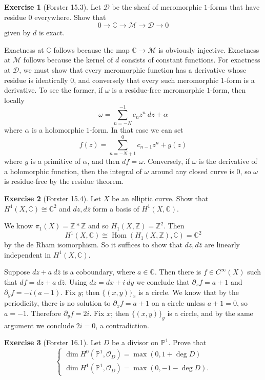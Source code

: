 \documentclass[10pt]{article}
\newcommand{\ZZ}{\mathbb{Z}}
\newcommand{\CC}{\mathbb{C}}
\newcommand{\PP}{\mathbb P}
\newcommand{\Hom}{\operatorname{Hom}}
\newcommand{\Olo}{\mathscr O}
\theoremstyle{definition}
\newtheorem{exer}{Exercise}
\begin{document}
\begin{exer}[Forster 15.3]
Let $\mathscr D$ be the sheaf of meromorphic $1$-forms that have residue $0$ everywhere.
Show that
$$0 \to \CC \to \mathscr M \to \mathscr D \to 0$$
given by $d$ is exact.
\end{exer}

Exactness at $\CC$ follows because the map $\CC \to \mathscr M$ is obviously injective.
Exactness at $\mathscr M$ follows because the kernel of $d$ consists of constant functions.
For exactness at $\mathscr D$, we must show that every meromorphic function has a derivative whose residue is identically $0$, and conversely that every such meromorphic $1$-form is a derivative.
To see the former, if $\omega$ is a residue-free meromorphic $1$-form, then locally
$$\omega = \sum_{n=-N}^{-1} c_n z^n ~dz + \alpha$$
where $\alpha$ is a holomorphic $1$-form. In that case we can set
$$f(z) = \sum_{n=-N+1}^0 c_{n-1} z^n + g(z)$$
where $g$ is a primitive of $\alpha$, and then $df = \omega$.
Conversely, if $\omega$ is the derivative of a holomorphic function, then the integral of $\omega$ around any closed curve is $0$, so $\omega$ is residue-free by the residue theorem.

\begin{exer}[Forster 15.4]
Let $X$ be an elliptic curve. Show that $H^1(X, \CC) \cong \CC^2$ and $dz,d\overline z$ form a basis of $H^1(X, \CC)$.
\end{exer}

We know $\pi_1(X) = \ZZ * \ZZ$ and so $H_1(X, \ZZ) = \ZZ^2$.
Then
$$H^1(X, \CC) \cong \Hom(H_1(X, \ZZ), \CC) = \CC^2$$
by the de Rham isomorphism.
So it suffices to show that $dz,d\overline z$ are linearly independent in $H^1(X, \CC)$.

Suppose $dz + a~d\overline z$ is a coboundary, where $a \in \CC$.
Then there is $f \in C^\infty(X)$ such that $df = dz + a~d\overline z$.
Using $dz = dx +i~dy$ we conclude that $\partial_x f = a + 1$ and $\partial_y f = -i(a - 1)$.
Fix $y$; then $\{(x, y)\}_x$ is a circle.
We know that by the periodicity, there is no solution to $\partial_x f = a + 1$ on a circle unless $a + 1 = 0$, so $a = -1$.
Therefore $\partial_y f = 2i$.
Fix $x$; then $\{(x, y)\}_y$ is a circle, and by the same argument we conclude $2i = 0$, a contradiction.

\begin{exer}[Forster 16.1]
Let $D$ be a divisor on $\PP^1$. Prove that
$$\begin{cases}
\dim H^0(\PP^1, \Olo_D) = \max(0, 1 + \deg D)\\
\dim H^1(\PP^1, \Olo_D) = \max(0, -1 - \deg D).
\end{cases}$$
\end{exer}
\end{document}
